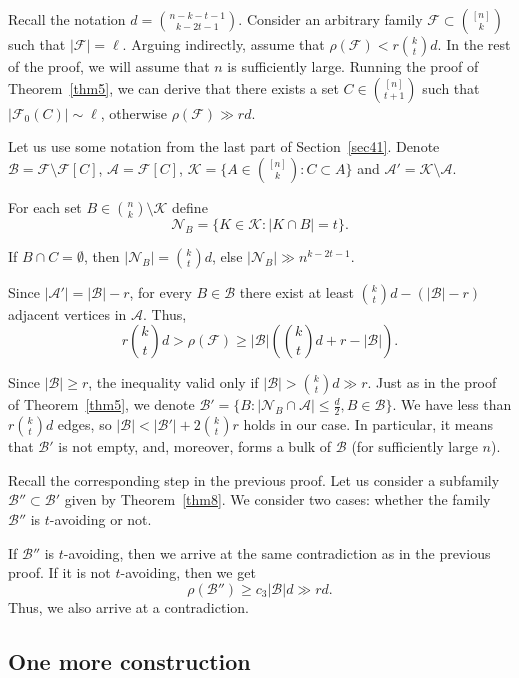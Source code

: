 \documentclass[12pt,a4paper]{article}
\newcommand{\ff}{\mathcal{F}}
\newcommand{\cA}{\mathcal{A}}
\newcommand{\bb}{\mathcal{B}}
\begin{document}
Recall the notation $d =\binom{n-k-t-1}{k-2t-1}.$ Consider an arbitrary family $\mathcal{F} \subset\binom{[n]}{k}$ such that $|\mathcal{F}| = \ell$. Arguing indirectly, assume that $\rho(\mathcal{F}) < r\binom{k}{t}d.$ In the rest of the proof, we will assume that $n$ is sufficiently large. Running the proof of Theorem~\ref{thm5}, we can derive that there exists a set $C \in \binom{[n]}{t+1}$ such that $|\mathcal{F}_0(C)| \sim \ell$, otherwise $\rho(\ff) \gg rd$.

Let us use some notation from the last part of Section~\ref{sec41}. Denote $\mathcal{B} = \mathcal{F} \setminus \mathcal{F}[C]$, $\mathcal{A} = \mathcal{F}[C]$, $\mathcal{K} = \{A \in \binom{[n]}{k}: C \subset A \}$ and $\mathcal{A}' = \mathcal{K} \setminus \mathcal{A}$.

For each set $B \in \binom{n}{k} \setminus \mathcal{K}$ define 
$$\mathcal{N}_B = \{K \in \mathcal{K} : |K \cap B| = t \}.$$


If $B \cap C = \emptyset$, then
$|\mathcal{N}_B| = \binom{k}{t}d$, else $|\mathcal{N}_B| \gg n^{k-2t-1}$.

Since $|\cA'| = |\mathcal{B}| - r$,  for every $B \in \mathcal{B}$ there exist at least $\binom{k}{t}d - (|\mathcal{B}| - r )$ adjacent vertices in $\cA$. Thus, $$ r\binom{k}{t}d > \rho(\mathcal{F}) \geq |\mathcal{B}|\left(\binom{k}{t}d+r - |\mathcal{B}|\right).$$

Since $|\bb| \geqslant r$, the inequality valid only if $|\mathcal{B}| > \binom{k}{t}d \gg r.$ Just as in the proof of Theorem~\ref{thm5}, we denote $\bb'= \{ B : |\mathcal{N}_B \cap \cA| \leqslant \frac{d}{2}, B \in \bb  \}$. We have less than $r\binom{k}{t}d$ edges, so  $|\bb| < |\bb'| +2\binom{k}{t}r$ holds in our case. In particular, it means that $\bb'$ is not empty, and, moreover, forms a bulk of $\bb$ (for sufficiently large $n$).

Recall the corresponding step in the previous proof. Let us consider a subfamily $\bb'' \subset \bb'$ given by Theorem~\ref{thm8}. We consider two cases: whether the family $\bb''$ is $t$-avoiding or not.

If $\bb''$ is $t$-avoiding, then we arrive at the same contradiction as in the previous proof. If it is not $t$-avoiding, then we get
$$\rho(\bb'') \geqslant c_3 |\bb|d \gg rd.$$
Thus, we also arrive at a contradiction.


\subsection{One more construction}\label{sec52}
\end{document}

